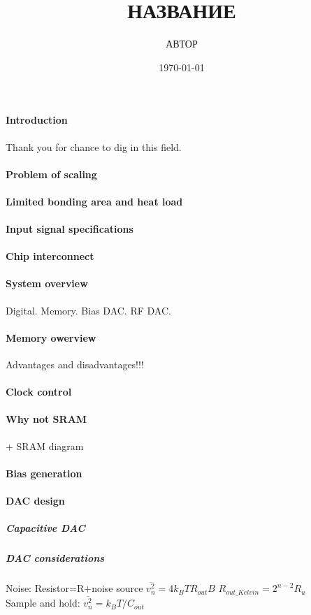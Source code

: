 \documentclass[a4paper,12pt]{article} %
\author{АВТОР }
\title{НАЗВАНИЕ}
\date{\today}
\begin{document}
\paragraph{Introduction}
Thank you for chance to dig in this field.

\paragraph{Problem of scaling}


\paragraph{Limited bonding area and heat load}
\paragraph{Input signal specifications}
\paragraph{Chip interconnect}

\paragraph{System overview} Digital. Memory. Bias DAC. RF DAC.
\paragraph{Memory owerview}
Advantages and disadvantages!!!
\paragraph{Clock control}
\paragraph{Why not SRAM} + SRAM diagram
\paragraph{Bias generation}

\paragraph{DAC design}
\subparagraph{Capacitive DAC}
\subparagraph{DAC considerations} Noise: Resistor=R+noise source  $ \overline{v_n^2} = 4k_BTR_{out}B  $ \hspace{2mm}
$R_{out\_Kelvin}=2^{n-2}R_u$ \\
Sample and hold: $\overline{v_n^2} = k_BT/C_{out}$
\end{document}

